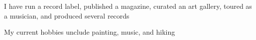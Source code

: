 \documentclass[9pt]{developercv} %
\begin{document}

\begin{minipage}[t]{0.46\textwidth}
	\vspace{-6pt}

	I have run a record label, published a magazine, curated an art gallery, toured as a musician, and produced several records

\end{minipage}
\hfill %
\begin{minipage}[t]{0.465\textwidth}
    \vspace{-6pt}
    
    My current hobbies unclude painting, music, and hiking

\end{minipage}
\end{document}
